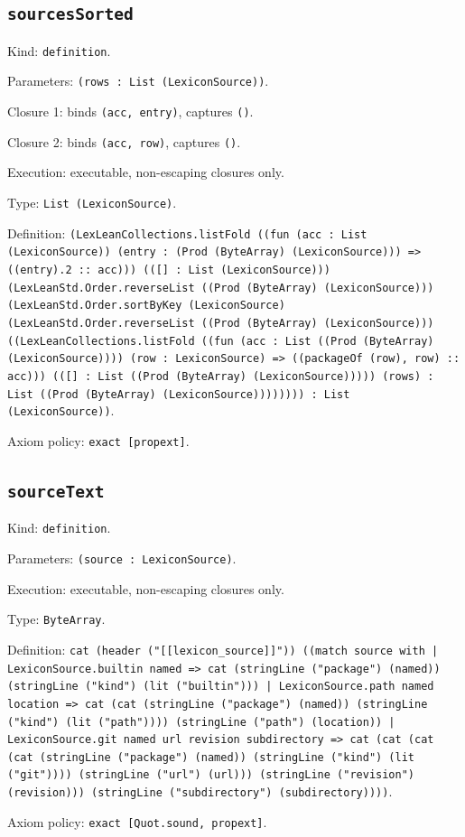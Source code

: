 \documentclass[11pt]{article}
\begin{document}
\subsection*{\texttt{sourcesSorted}}
\noindent Kind: \texttt{definition}.\par
\noindent Parameters: \texttt{(rows : List (LexiconSource))}.\par
\noindent Closure 1: binds \texttt{(acc, entry)}, captures \texttt{()}.\par
\noindent Closure 2: binds \texttt{(acc, row)}, captures \texttt{()}.\par
\noindent Execution: executable, non-escaping closures only.\par
\noindent Type: \texttt{List (LexiconSource)}.\par
\noindent Definition: \texttt{(LexLeanCollections.listFold ((fun (acc : List (LexiconSource)) (entry : (Prod (ByteArray) (LexiconSource))) => ((entry).2 :: acc))) (([] : List (LexiconSource))) (LexLeanStd.Order.reverseList ((Prod (ByteArray) (LexiconSource))) (LexLeanStd.Order.sortByKey (LexiconSource) (LexLeanStd.Order.reverseList ((Prod (ByteArray) (LexiconSource))) ((LexLeanCollections.listFold ((fun (acc : List ((Prod (ByteArray) (LexiconSource)))) (row : LexiconSource) => ((packageOf (row), row) :: acc))) (([] : List ((Prod (ByteArray) (LexiconSource))))) (rows) : List ((Prod (ByteArray) (LexiconSource)))))))) : List (LexiconSource))}.\par
\noindent Axiom policy: \texttt{exact [propext]}.\par
\subsection*{\texttt{sourceText}}
\noindent Kind: \texttt{definition}.\par
\noindent Parameters: \texttt{(source : LexiconSource)}.\par
\noindent Execution: executable, non-escaping closures only.\par
\noindent Type: \texttt{ByteArray}.\par
\noindent Definition: \texttt{cat (header ("[[lexicon\_source]]")) ((match source with | LexiconSource.builtin named => cat (stringLine ("package") (named)) (stringLine ("kind") (lit ("builtin"))) | LexiconSource.path named location => cat (cat (stringLine ("package") (named)) (stringLine ("kind") (lit ("path")))) (stringLine ("path") (location)) | LexiconSource.git named url revision subdirectory => cat (cat (cat (cat (stringLine ("package") (named)) (stringLine ("kind") (lit ("git")))) (stringLine ("url") (url))) (stringLine ("revision") (revision))) (stringLine ("subdirectory") (subdirectory))))}.\par
\noindent Axiom policy: \texttt{exact [Quot.sound, propext]}.\par
\end{document}
